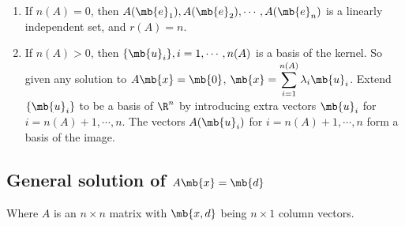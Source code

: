 \documentclass[a4paper]{article}
\begin{document}
\begin{enumerate}
\item If $n(A) = 0$, then $A(\mb{e}_1), A(\mb{e}_2), \cdots, A(\mb{e}_n)$ is a linearly independent set, and $r(A) = n$.
\item If $n(A) > 0$, then $\{\mb{u}_i\}, i = 1, \cdots, n(A)$ is a basis of the kernel. So given any solution to $A\mb{x} = \mb{0}$, $\displaystyle \mb{x} = \sum_{i = 1}^{n(A)} \lambda_i \mb{u}_i$. Extend $\{\mb{u}_i\}$ to be a basis of $\R^n$ by introducing extra vectors $\mb{u}_{i}$ for $i = n(A) + 1, \cdots, n$. The vectors $A(\mb{u}_i)$ for $i = n(A) + 1, \cdots, n$ form a basis of the image.
\end{enumerate}

\subsection{General solution of \texorpdfstring{$A\mb{x} = \mb{d}$}{Ax = d}}
Where $A$ is an $n\times n$ matrix with $\mb{x, d}$ being $n \times 1$ column vectors.
\end{document}
